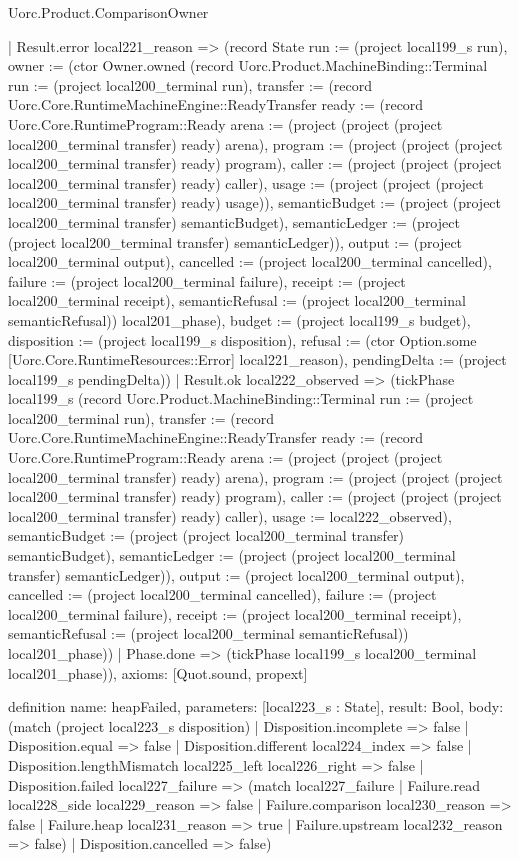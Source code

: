 \begin{lexlean}{Uorc.Product.ComparisonOwner}
\begin{semanticmodule}
{      | Result.error local221_reason => (record State {run := (project local199_s run), owner := (ctor Owner.owned (record Uorc.Product.MachineBinding::Terminal {run := (project local200_terminal run), transfer := (record Uorc.Core.RuntimeMachineEngine::ReadyTransfer {ready := (record Uorc.Core.RuntimeProgram::Ready {arena := (project (project (project local200_terminal transfer) ready) arena), program := (project (project (project local200_terminal transfer) ready) program), caller := (project (project (project local200_terminal transfer) ready) caller), usage := (project (project (project local200_terminal transfer) ready) usage)}), semanticBudget := (project (project local200_terminal transfer) semanticBudget), semanticLedger := (project (project local200_terminal transfer) semanticLedger)}), output := (project local200_terminal output), cancelled := (project local200_terminal cancelled), failure := (project local200_terminal failure), receipt := (project local200_terminal receipt), semanticRefusal := (project local200_terminal semanticRefusal)}) local201_phase), budget := (project local199_s budget), disposition := (project local199_s disposition), refusal := (ctor Option.some [Uorc.Core.RuntimeResources::Error] local221_reason), pendingDelta := (project local199_s pendingDelta)})
      | Result.ok local222_observed => (tickPhase local199_s (record Uorc.Product.MachineBinding::Terminal {run := (project local200_terminal run), transfer := (record Uorc.Core.RuntimeMachineEngine::ReadyTransfer {ready := (record Uorc.Core.RuntimeProgram::Ready {arena := (project (project (project local200_terminal transfer) ready) arena), program := (project (project (project local200_terminal transfer) ready) program), caller := (project (project (project local200_terminal transfer) ready) caller), usage := local222_observed}), semanticBudget := (project (project local200_terminal transfer) semanticBudget), semanticLedger := (project (project local200_terminal transfer) semanticLedger)}), output := (project local200_terminal output), cancelled := (project local200_terminal cancelled), failure := (project local200_terminal failure), receipt := (project local200_terminal receipt), semanticRefusal := (project local200_terminal semanticRefusal)}) local201_phase))
    | Phase.done => (tickPhase local199_s local200_terminal local201_phase)),
  axioms: [Quot.sound, propext]
}

definition{
  name: heapFailed,
  parameters: [local223_s : State],
  result: Bool,
  body: (match (project local223_s disposition)
    | Disposition.incomplete => false
    | Disposition.equal => false
    | Disposition.different local224_index => false
    | Disposition.lengthMismatch local225_left local226_right => false
    | Disposition.failed local227_failure => (match local227_failure
      | Failure.read local228_side local229_reason => false
      | Failure.comparison local230_reason => false
      | Failure.heap local231_reason => true
      | Failure.upstream local232_reason => false)
    | Disposition.cancelled => false)
}


\end{semanticmodule}
\end{lexlean}
